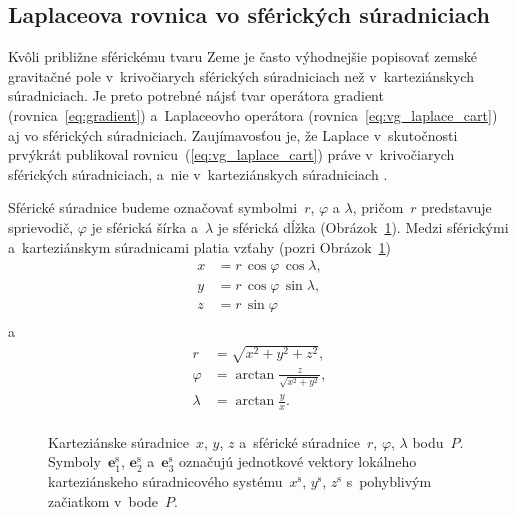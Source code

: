 \documentclass[a4paper,12pt]{book}
\let\vec\mathbf
\begin{document}
\subsection{Laplaceova rovnica vo sférických súradniciach}
\label{sec:laplace_equation_sph}

Kvôli približne sférickému tvaru Zeme je často výhodnejšie popisovať zemské 
gravitačné pole v~krivočiarych sférických súradniciach než v~karteziánskych 
súradniciach.  Je preto potrebné nájsť tvar operátora gradient 
(rovnica~\ref{eq:gradient}) a~Laplaceovho operátora 
(rovnica~\ref{eq:vg_laplace_cart}) aj vo sférických súradniciach.  
Zaujímavosťou je, že Laplace v~skutočnosti prvýkrát publikoval 
rovnicu~(\ref{eq:vg_laplace_cart}) práve v~krivočiarych sférických 
súradniciach, a~nie v~karteziánskych súradniciach \parencite{MacMillan1930}.

Sférické súradnice budeme označovať symbolmi~$r$, $\varphi$ a $\lambda$, 
pričom~$r$ predstavuje sprievodič, $\varphi$ je sférická šírka a~$\lambda$ je 
sférická dĺžka (Obrázok~\ref{fig:cart_sph}).  Medzi sférickými a~karteziánskym 
súradnicami platia vzťahy (pozri Obrázok~\ref{fig:cart_sph})
%
\begin{equation}
\label{eq:sph2cart}
\begin{split}
x &= r \, \cos\varphi \, \cos\lambda{,}\\
y &= r \, \cos\varphi \, \sin\lambda{,}\\
z &= r \, \sin\varphi\\
\end{split}
\end{equation}
%
a
%
\begin{equation}
\label{eq:cart2sph}
\begin{split}
r &= \sqrt{x^2 + y^2 + z^2}{,}\\
\varphi &= \arctan \frac{z}{\sqrt{x^2 + y^2}}{,}\\
\lambda &= \arctan \frac{y}{x}{.}\\
\end{split}
\end{equation}

\begin{figure}
\centering

\caption{Karteziánske súradnice~$x$, $y$, $z$ a~sférické súradnice~$r$, 
$\varphi$, $\lambda$ bodu~$P$.  Symboly~$\vec{e}_1^\mathrm{s}$, 
$\vec{e}_2^\mathrm{s}$ a~$\vec{e}_3^\mathrm{s}$ označujú jednotkové vektory 
lokálneho karteziánskeho súradnicového systému~$x^\mathrm{s}$, $y^\mathrm{s}$, 
$z^\mathrm{s}$ s~pohyblivým začiatkom v~bode~$P$.}
\label{fig:cart_sph}
\end{figure}
\end{document}
